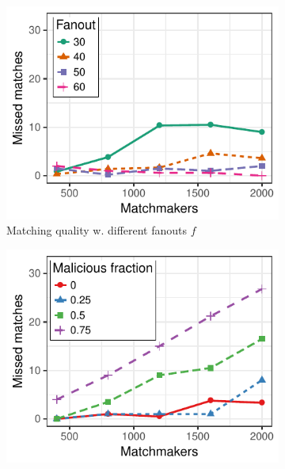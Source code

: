 




\begin{figure}[t!]
	\centering
	\begin{subfigure}{.5\columnwidth}
		\centering
		\includegraphics[width=\linewidth]{match/assets/plots/asset_trading_quality.pdf}
		\caption{Matching quality w. different fanouts $ f $}
		\label{fig:asset_trading_quality}
	\end{subfigure}%
	\begin{subfigure}{.5\columnwidth}
		\centering
		\includegraphics[width=\columnwidth]{match/assets/plots/asset_trading_fairness_fixed.pdf}

\end{subfigure}
\end{figure}

